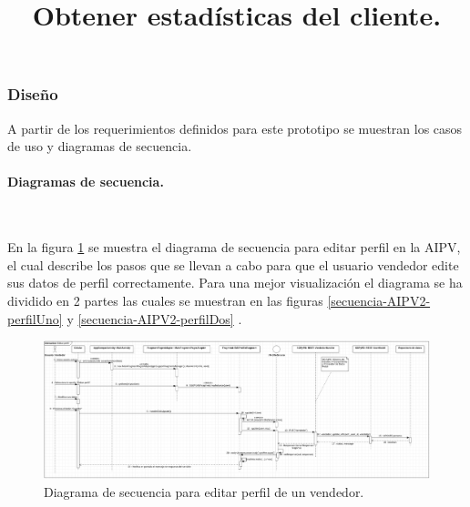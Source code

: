 \subsubsection{Diseño}

A partir de los requerimientos definidos para este prototipo se muestran los casos de uso y diagramas de secuencia.\\ \par


\paragraph{Diagramas de secuencia.} ~\\

\title{\textbf{Obtener estadísticas del cliente.}\\}

En la figura \ref{secuencia-AIPV2-perfil} se muestra el diagrama de secuencia para editar perfil en la AIPV, el cual describe los pasos que se llevan  a cabo para que el usuario vendedor edite sus datos de perfil correctamente. Para una mejor visualización el diagrama se ha dividido en 2 partes las cuales se muestran en las figuras \ref{secuencia-AIPV2-perfilUno} y \ref{secuencia-AIPV2-perfilDos} .

\FloatBarrier
\begin{figure}[htbp!]
		\centering
			\includegraphics[width=1 \textwidth]{imagenes/adrian/vendedor/prototipo2/editar_perfil}
		\caption{Diagrama de secuencia para editar perfil de un vendedor.}
		\label{secuencia-AIPV2-perfil}
\end{figure}
\FloatBarrier

